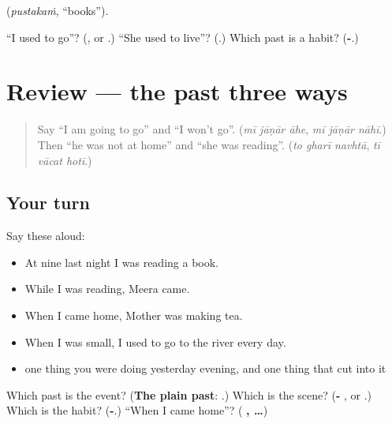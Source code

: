 \textbf{} (\emph{pustakaṁ}, \textquotedblleft{}books\textquotedblright{}).

\begin{tcolorbox}[breakable,colback=teal!4,colframe=teal!35!black,title={Before you move on}]
\textquotedblleft{}I used to go\textquotedblright{}? (\textbf{}, or \textbf{}.) \textquotedblleft{}She used to live\textquotedblright{}? (\textbf{}.) Which past is a habit? (\textbf{-}.)
\end{tcolorbox}
\section[(review)]{Review — the past three ways}

\label{lesson:MR-R278-the-past-three-ways}



\begin{quote}
Say \textquotedblleft{}I am going to go\textquotedblright{} and \textquotedblleft{}I won't go\textquotedblright{}. (\emph{mī jāṇār āhe}, \emph{mī jāṇār nāhī}.) Then \textquotedblleft{}he was not at home\textquotedblright{} and \textquotedblleft{}she was reading\textquotedblright{}. (\emph{to gharī navhtā}, \emph{tī vācat hotī}.)
\end{quote}

\subsection*{Your turn}
Say these aloud:

\begin{itemize}
\raggedright
  \item At nine last night I was reading a book.
  \item While I was reading, Meera came.
  \item When I came home, Mother was making tea.
  \item When I was small, I used to go to the river every day.
  \item one thing you were doing yesterday evening, and one thing that cut into it
\end{itemize}

\begin{tcolorbox}[breakable,colback=teal!4,colframe=teal!35!black,title={Before you move on}]
Which past is the event? (\textbf{The plain past}: \textbf{}.) Which is the scene? (\textbf{- }, or \textbf{}.) Which is the habit? (\textbf{-}.) \textquotedblleft{}When I came home\textquotedblright{}? (\textbf{  ,  …})
\end{tcolorbox}
